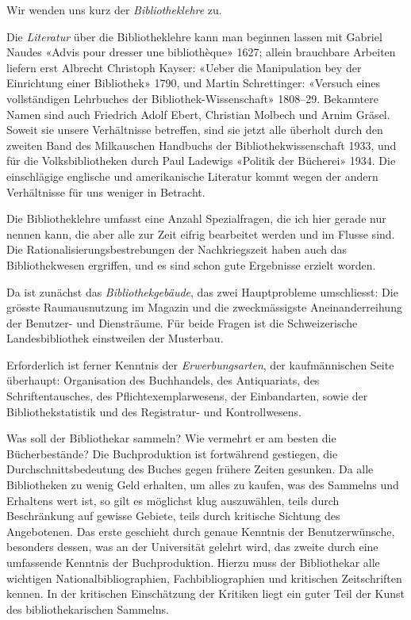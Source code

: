 \documentclass[a4paper,
fontsize=11pt,
oneside,
numbers=noperiodatend,
parskip=half-,
bibliography=totoc,
final
]{scrartcl}
\begin{document}
Wir wenden uns kurz der \emph{Bibliotheklehre} zu.

Die \emph{Literatur} über die Bibliotheklehre kann man beginnen lassen
mit Gabriel Naudes «Advis pour dresser une bibliothèque» 1627; allein
brauchbare Arbeiten liefern erst Albrecht Christoph Kayser: «Ueber die
Manipulation bey der Einrichtung einer Bibliothek» 1790, und Martin
Schrettinger: «Versuch eines vollständigen Lehrbuches der
Bibliothek-Wissenschaft» 1808--29. Bekanntere Namen sind auch Friedrich
Adolf Ebert, Christian Molbech und Arnim Gräsel. Soweit sie unsere
Verhältnisse betreffen, sind sie jetzt alle überholt durch den zweiten
Band des Milkauschen Handbuchs der Bibliothekwissenschaft 1933, und für
die Volksbibliotheken durch Paul Ladewigs «Politik der Bücherei» 1934.
Die einschlägige englische und amerikanische Literatur kommt wegen der
andern Verhältnisse für uns weniger in Betracht.

Die Bibliotheklehre umfasst eine Anzahl Spezialfragen, die ich hier
gerade nur nennen kann, die aber alle zur Zeit eifrig bearbeitet werden
und im Flusse sind. Die Rationalisierungsbestrebungen der Nachkriegszeit
haben auch das Bibliothekwesen ergriffen, und es sind schon gute
Ergebnisse erzielt worden.

Da ist zunächst das \emph{Bibliothekgebäude}, das zwei Hauptprobleme
umschliesst: Die grösste Raumausnutzung im Magazin und die
zweckmässigste Aneinanderreihung der Benutzer- und Diensträume. Für
beide Fragen ist die Schweizerische Landesbibliothek einstweilen der
Musterbau.

Erforderlich ist ferner Kenntnis der \emph{Erwerbungsarten}, der
kaufmännischen Seite überhaupt: Organisation des Buchhandels, des
Antiquariats, des Schriftentausches, des Pflichtexemplarwesens, der
Einbandarten, sowie der Bibliothekstatistik und des Registratur- und
Kontrollwesens.

Was soll der Bibliothekar sammeln? Wie vermehrt er am besten die
Bücherbestände? Die Buchproduktion ist fortwährend gestiegen, die
Durchschnittsbedeutung des Buches gegen frühere Zeiten gesunken. Da alle
Bibliotheken zu wenig Geld erhalten, um alles zu kaufen, was des
Sammelns und Erhaltens wert ist, so gilt es möglichst klug auszuwählen,
teils durch Beschränkung auf gewisse Gebiete, teils durch kritische
Sichtung des Angebotenen. Das erste geschieht durch genaue Kenntnis der
Benutzerwünsche, besonders dessen, was an der Universität gelehrt wird,
das zweite durch eine umfassende Kenntnis der Buchproduktion. Hierzu
muss der Bibliothekar alle wichtigen Nationalbibliographien,
Fachbibliographien und kritischen Zeitschriften kennen. In der
kritischen Einschätzung der Kritiken liegt ein guter Teil der Kunst des
bibliothekarischen Sammelns.
\end{document}
